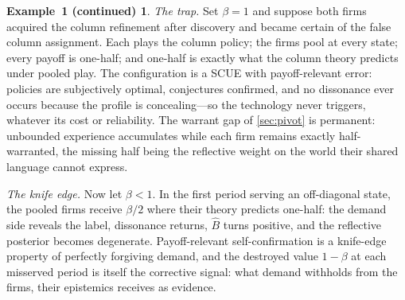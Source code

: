 \documentclass[11pt]{article}
\theoremstyle{definition}
\newtheorem*{excont}{Example~1 (continued)}
\begin{document}
\begin{excont}
\emph{The trap.}
Set $\beta=1$ and suppose both firms acquired the column refinement after discovery and became certain of the false column assignment.
Each plays the column policy; the firms pool at every state; every payoff is one-half; and one-half is exactly what the column theory predicts under pooled play.
The configuration is a SCUE with payoff-relevant error: policies are subjectively optimal, conjectures confirmed, and no dissonance ever occurs because the profile is concealing---so the technology never triggers, whatever its cost or reliability.
The warrant gap of \cref{sec:pivot} is permanent: unbounded experience accumulates while each firm remains exactly half-warranted, the missing half being the reflective weight on the world their shared language cannot express.

\emph{The knife edge.}
Now let $\beta<1$.
In the first period serving an off-diagonal state, the pooled firms receive $\beta/2$ where their theory predicts one-half: the demand side reveals the label, dissonance returns, $\widehat B$ turns positive, and the reflective posterior becomes degenerate.
Payoff-relevant self-confirmation is a knife-edge property of perfectly forgiving demand, and the destroyed value $1-\beta$ at each misserved period is itself the corrective signal: what demand withholds from the firms, their epistemics receives as evidence.


\end{excont}
\end{document}
